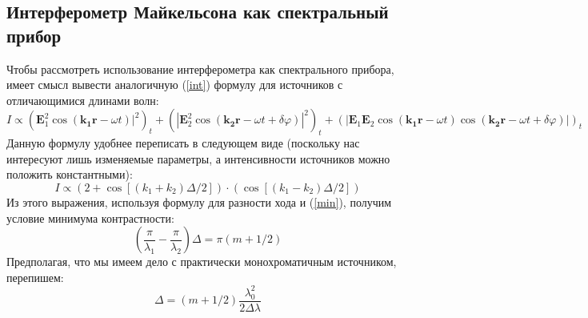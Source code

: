 \documentclass[a4paper, 12pt]{article}
\renewcommand{\phi}{\varphi} %
\begin{document}
	\subsection*{Интерферометр Майкельсона как спектральный прибор}
	Чтобы рассмотреть использование интерферометра как спектрального прибора, имеет смысл вывести аналогичную (\ref{int}) формулу  для источников с отличающимися длинами волн:
	\begin{equation}
				I \propto( \mathbf{E}^2_1 \cos(\mathbf{k_1 r} - \omega t)|^2)_t +
				(|\mathbf{E}^2_2 \cos(\mathbf{k_2 r} - \omega t + \delta \phi)|^2)_t
				+( |\mathbf{E}_1 \mathbf{E}_2\cos(\mathbf{k_1r} - \omega t)\cos(\mathbf{k_2 r} - \omega t + \delta \phi)|)_t
	\end{equation}
	Данную формулу удобнее переписать в следующем виде (поскольку нас интересуют лишь изменяемые параметры, а интенсивности источников можно положить константными):
	\begin{equation}	
				I \propto (2 + \cos[(k_1 + k_2) \Delta / 2]) \cdot (\cos[(k_1 - k_2)\Delta/2])
	\end{equation}
	Из этого выражения, используя формулу для разности хода и (\ref{min}), получим условие минимума контрастности:
	\begin{equation}
		(\frac{\pi}{\lambda_1} - \frac{\pi}{\lambda_2}) \Delta = \pi (m + 1/2)
	\end{equation}
	Предполагая, что мы имеем дело с практически монохроматичным источником, перепишем:
	\begin{equation}\label{sp}
		\Delta = (m + 1/2) \frac{\lambda_0^2}{2\Delta \lambda}
	\end{equation}
\end{document}
